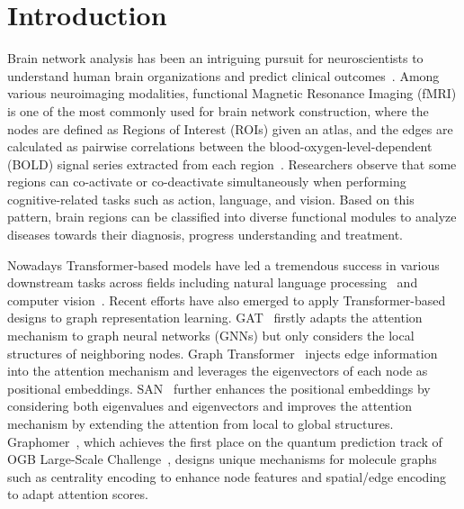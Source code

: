 \section{Introduction}
Brain network analysis has been an intriguing pursuit for neuroscientists to understand human brain organizations and predict clinical outcomes~\citep{genderfunction, wangfilter, hierarchicalyin, brainnetworks, concepts,guo2008unified, shi2016,higgins2018integrative,hierarchicalyin,higgins2019difference,kundu2019novel,lukemire2021bayesian,hu2022multimodal}. Among various neuroimaging modalities, functional Magnetic Resonance Imaging (fMRI) is one of the most commonly used for brain network construction, where the nodes are defined as Regions of Interest (ROIs) given an atlas, and the edges are calculated as pairwise correlations between the blood-oxygen-level-dependent (BOLD) signal series extracted from each region~\citep{modellingfmri, simpson2013analyzing,wangfilter,dai2017predicting}. Researchers observe that some regions can co-activate or co-deactivate simultaneously when performing cognitive-related tasks such as action, language, and vision. Based on this pattern, brain regions can be classified into diverse functional modules to analyze diseases towards their diagnosis, progress understanding and treatment. 

Nowadays Transformer-based models have led a tremendous success in various downstream tasks across fields including natural language processing~\citep{NIPS2017_3f5ee243, DBLP:conf/acl/DaiYYCLS19} and computer vision~\citep{dosovitskiy2021an,chu2021Twins,tu2022maxvit}. Recent efforts have also emerged to apply Transformer-based designs to graph representation learning. GAT~\citep{DBLP:conf/iclr/VelickovicCCRLB18} firstly adapts the attention mechanism to graph neural networks (GNNs) but only considers the local structures of neighboring nodes. Graph Transformer~\citep{graphtransformer_aaai} injects edge information into the attention mechanism and leverages the eigenvectors of each node as positional embeddings. SAN~\citep{san} further enhances the positional embeddings by considering both eigenvalues and eigenvectors and improves the attention mechanism by extending the attention from local to global structures.
Graphomer~\citep{graphormer}, which achieves the first place on the quantum prediction track of OGB Large-Scale Challenge~\citep{hu2020open}, designs unique mechanisms for molecule graphs such as centrality encoding to enhance node features and spatial/edge encoding to adapt attention scores. 

